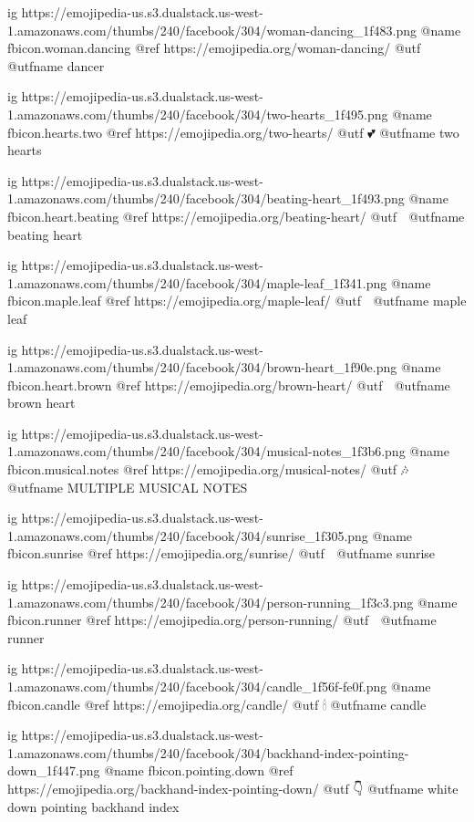   ig https://emojipedia-us.s3.dualstack.us-west-1.amazonaws.com/thumbs/240/facebook/304/woman-dancing_1f483.png
  @name fbicon.woman.dancing
  @ref https://emojipedia.org/woman-dancing/
  @utf 💃
  @utfname dancer

  ig https://emojipedia-us.s3.dualstack.us-west-1.amazonaws.com/thumbs/240/facebook/304/two-hearts_1f495.png
  @name fbicon.hearts.two
  @ref https://emojipedia.org/two-hearts/
  @utf 💕
  @utfname two hearts

  ig https://emojipedia-us.s3.dualstack.us-west-1.amazonaws.com/thumbs/240/facebook/304/beating-heart_1f493.png
  @name fbicon.heart.beating
  @ref https://emojipedia.org/beating-heart/
  @utf 💓
  @utfname beating heart

  ig https://emojipedia-us.s3.dualstack.us-west-1.amazonaws.com/thumbs/240/facebook/304/maple-leaf_1f341.png
  @name fbicon.maple.leaf
  @ref https://emojipedia.org/maple-leaf/
  @utf 🍁
  @utfname maple leaf

  ig https://emojipedia-us.s3.dualstack.us-west-1.amazonaws.com/thumbs/240/facebook/304/brown-heart_1f90e.png
  @name fbicon.heart.brown
  @ref https://emojipedia.org/brown-heart/
  @utf 🤎
  @utfname brown heart

  ig https://emojipedia-us.s3.dualstack.us-west-1.amazonaws.com/thumbs/240/facebook/304/musical-notes_1f3b6.png
  @name fbicon.musical.notes
  @ref https://emojipedia.org/musical-notes/
  @utf 🎶
  @utfname MULTIPLE MUSICAL NOTES

  ig https://emojipedia-us.s3.dualstack.us-west-1.amazonaws.com/thumbs/240/facebook/304/sunrise_1f305.png
  @name fbicon.sunrise
  @ref https://emojipedia.org/sunrise/
  @utf 🌅
  @utfname sunrise

  ig https://emojipedia-us.s3.dualstack.us-west-1.amazonaws.com/thumbs/240/facebook/304/person-running_1f3c3.png
  @name fbicon.runner
  @ref https://emojipedia.org/person-running/
  @utf 🏃
  @utfname runner

  ig https://emojipedia-us.s3.dualstack.us-west-1.amazonaws.com/thumbs/240/facebook/304/candle_1f56f-fe0f.png
  @name fbicon.candle
  @ref https://emojipedia.org/candle/
  @utf 🕯
  @utfname candle

  ig https://emojipedia-us.s3.dualstack.us-west-1.amazonaws.com/thumbs/240/facebook/304/backhand-index-pointing-down_1f447.png
  @name fbicon.pointing.down
  @ref https://emojipedia.org/backhand-index-pointing-down/
  @utf 👇
  @utfname white down pointing backhand index

